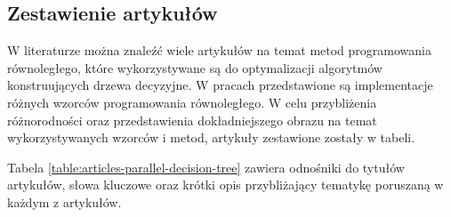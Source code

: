\documentclass[12pt]{article}
\begin{document}
\subsection{Zestawienie artykułów}

W literaturze można znaleźć wiele artykułów na temat metod programowania równoległego, które wykorzystywane są do optymalizacji algorytmów konstruujących drzewa decyzyjne. 
W pracach przedstawione są implementacje różnych wzorców programowania równoległego. W celu przybliżenia różnorodności oraz przedstawienia
dokładniejszego obrazu na temat wykorzystywanych wzorców i metod, artykuły zestawione zostały w tabeli. 

Tabela \ref{table:articles-parallel-decision-tree} zawiera odnośniki do tytułów artykułów, słowa kluczowe oraz krótki opis przybliżający tematykę poruszaną w każdym z artykułów.
\end{document}

